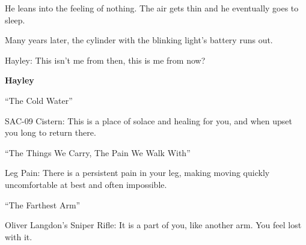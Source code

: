 He leans into the feeling of nothing.  The air gets thin and he eventually goes to sleep. 



Many years later, the cylinder with the blinking light's battery runs out. 




Hayley: This isn't me from then, this is me from now?\\[4mm]








\textbf{Hayley}



 ``The Cold Water''

 SAC-09 Cistern: This is a place of solace and healing for you, and when upset you long to return there.



 ``The Things We Carry, The Pain We Walk With''

 Leg Pain: There is a persistent pain in your leg, making moving quickly uncomfortable at best and often impossible.



 ``The Farthest Arm''

 Oliver Langdon's Sniper Rifle: It is a part of you, like another arm. You feel lost with it.





